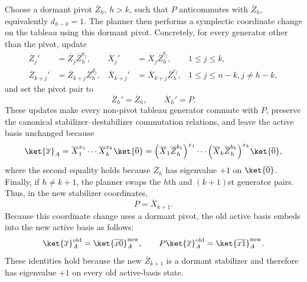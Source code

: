 \documentclass[a4paper,onecolumn,unpublished]{quantumarticle}
\DeclarePairedDelimiter\rbra{\lparen}{\rparen}
\begin{document}
Choose a dormant pivot $\overline{Z}_{h}$, $h > k$, such that $P$ anticommutes with $\overline{Z}_{h}$, equivalently $d_{h-k} = 1$.
The planner then performs a symplectic coordinate change on the tableau using this dormant pivot.
Concretely, for every generator other than the pivot, update
\begin{align*}
    \overline{Z}_j'
    &=
    \overline{Z}_j
    \overline{Z}_{h}^{a_j},
    &
    \overline{X}_j'
    &=
    \overline{X}_j
    \overline{Z}_{h}^{b_j},
    &
    1\leq j \leq k, \\
    \overline{Z}_{k+j}'
    &=
    \overline{Z}_{k+j}
    \overline{Z}_{h}^{d_{j}},
    &
    \overline{X}_{k+j}'
    &=
    \overline{X}_{k+j}
    \overline{Z}_{h}^{c_j},
    &
    1\leq j \leq n-k, j \neq h-k,
\end{align*}
and set the pivot pair to
\begin{equation*}
    \overline{Z}_h' = \overline{Z}_{h}, \qquad \overline{X}_h' = P.
\end{equation*}
These updates make every non-pivot tableau generator commute with $P$, preserve the canonical stabilizer--destabilizer commutation relations, and leave the active basis unchanged because
\begin{equation*}
    \ket{\overline{x}}_A = \overline{X}_1^{x_1}\cdots
    \overline{X}_k^{x_k}
    \ket{\overline{0}} = \rbra*{\overline{X}_1\overline{Z}_{h}^{b_1}}^{x_1}\cdots
    \rbra*{\overline{X}_k \overline{Z}_{h}^{b_k} }^{x_k}
    \ket{\overline{0}},
\end{equation*}
where the second equality holds because $\overline{Z}_{h}$ has eigenvalue $+1$ on $\ket{\overline{0}}$.
Finally, if $h\neq k+1$, the planner swaps the $h$th and $(k+1)$st generator pairs.
Thus, in the new stabilizer coordinates,
\begin{equation*}
    P = \overline{X}_{k+1}.
\end{equation*}
Because this coordinate change uses a dormant pivot, the old active basis embeds into the new active basis as follows:
\begin{equation}\label{eq:rotation-promotion-basis}
    \ket{\overline{x}}_A^{\text{old}} = \ket{\overline{x0}}_A^{\text{new}}, \qquad P\ket{\overline{x}}_A^{\text{old}} = \ket{\overline{x1}}_A^{\text{new}}.
\end{equation}
These identities hold because the new $\overline{Z}_{k+1}$ is a dormant stabilizer and therefore has eigenvalue $+1$ on every old active-basis state.
\end{document}
